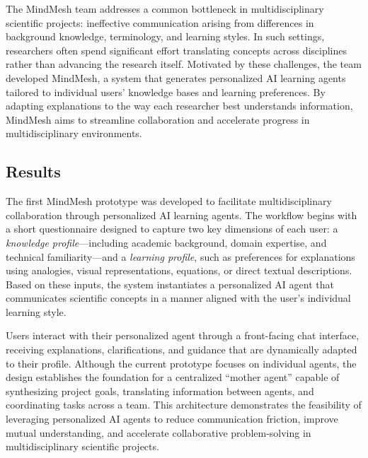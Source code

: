 The MindMesh team addresses a common bottleneck in multidisciplinary scientific projects: ineffective communication arising from differences in background knowledge, terminology, and learning styles. In such settings, researchers often spend significant effort translating concepts across disciplines rather than advancing the research itself. Motivated by these challenges, the team developed MindMesh, a system that generates personalized AI learning agents tailored to individual users’ knowledge bases and learning preferences. By adapting explanations to the way each researcher best understands information, MindMesh aims to streamline collaboration and accelerate progress in multidisciplinary environments.


\subsection*{Results}

The first MindMesh prototype was developed to facilitate multidisciplinary collaboration through personalized AI learning agents. The workflow begins with a short questionnaire designed to capture two key dimensions of each user: a \emph{knowledge profile}—including academic background, domain expertise, and technical familiarity—and a \emph{learning profile}, such as preferences for explanations using analogies, visual representations, equations, or direct textual descriptions. Based on these inputs, the system instantiates a personalized AI agent that communicates scientific concepts in a manner aligned with the user’s individual learning style.

Users interact with their personalized agent through a front-facing chat interface, receiving explanations, clarifications, and guidance that are dynamically adapted to their profile. Although the current prototype focuses on individual agents, the design establishes the foundation for a centralized “mother agent” capable of synthesizing project goals, translating information between agents, and coordinating tasks across a team. This architecture demonstrates the feasibility of leveraging personalized AI agents to reduce communication friction, improve mutual understanding, and accelerate collaborative problem-solving in multidisciplinary scientific projects.

